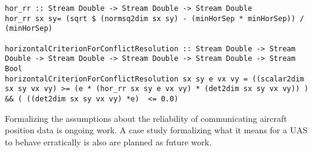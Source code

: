 %
%
%
%
\begin{lstlisting}[frame=single]
hor_rr :: Stream Double -> Stream Double -> Stream Double
hor_rr sx sy= (sqrt $ (normsq2dim sx sy) - (minHorSep * minHorSep)) / (minHorSep)

horizontalCriterionForConflictResolution :: Stream Double -> Stream Double -> Stream Double -> Stream Double -> Stream Double -> Stream Bool
horizontalCriterionForConflictResolution sx sy e vx vy = ((scalar2dim sx sy vx vy) >= (e * (hor_rr sx sy e vx vy) * (det2dim sx sy vx vy)) ) && ( ((det2dim sx sy vx vy) *e)  <= 0.0)
\end{lstlisting}

Formalizing the assumptions about the reliability of communicating
aircraft position data is ongoing work.  A case study formalizing what
it means for a UAS to behave erratically is also 
are planned as future work. 


%
%
%


